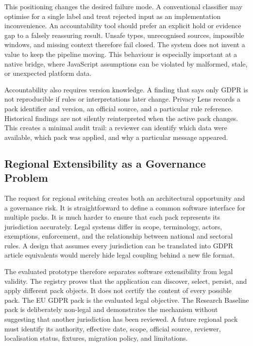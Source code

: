 This positioning changes the desired failure mode. A conventional classifier may optimise for a single label and treat rejected input as an implementation inconvenience. An accountability tool should prefer an explicit hold or evidence gap to a falsely reassuring result. Unsafe types, unrecognised sources, impossible windows, and missing context therefore fail closed. The system does not invent a value to keep the pipeline moving. This behaviour is especially important at a native bridge, where JavaScript assumptions can be violated by malformed, stale, or unexpected platform data.

Accountability also requires version knowledge. A finding that says only GDPR is not reproducible if rules or interpretations later change. Privacy Lens records a pack identifier and version, an official source, and a particular rule reference. Historical findings are not silently reinterpreted when the active pack changes. This creates a minimal audit trail: a reviewer can identify which data were available, which pack was applied, and why a particular message appeared.

\subsection{Regional Extensibility as a Governance Problem}

The request for regional switching creates both an architectural opportunity and a governance risk. It is straightforward to define a common software interface for multiple packs. It is much harder to ensure that each pack represents its jurisdiction accurately. Legal systems differ in scope, terminology, actors, exemptions, enforcement, and the relationship between national and sectoral rules. A design that assumes every jurisdiction can be translated into GDPR article equivalents would merely hide legal coupling behind a new file format.

The evaluated prototype therefore separates software extensibility from legal validity. The registry proves that the application can discover, select, persist, and apply different pack objects. It does not certify the content of every possible pack. The EU GDPR pack is the evaluated legal objective. The Research Baseline pack is deliberately non-legal and demonstrates the mechanism without suggesting that another jurisdiction has been reviewed. A future regional pack must identify its authority, effective date, scope, official source, reviewer, localisation status, fixtures, migration policy, and limitations.

